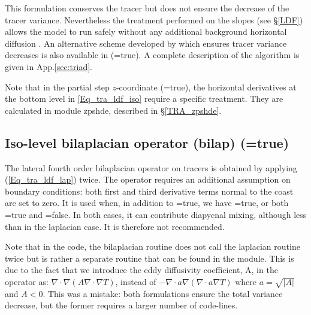 This formulation conserves the tracer but does not ensure the decrease 
of the tracer variance. Nevertheless the treatment performed on the slopes 
(see \S\ref{LDF}) allows the model to run safely without any additional 
background horizontal diffusion \citep{Guilyardi_al_CD01}. An alternative scheme 
developed by \cite{Griffies_al_JPO98} which ensures tracer variance decreases 
is also available in \NEMO (=true). A complete description of 
the algorithm is given in App.\ref{sec:triad}.

Note that in the partial step $z$-coordinate (=true), the horizontal 
derivatives at the bottom level in \eqref{Eq_tra_ldf_iso} require a specific 
treatment. They are calculated in module zpshde, described in \S\ref{TRA_zpshde}.

\subsection   [Iso-level bilaplacian operator (bilap) (\np{ln\_traldf\_bilap})]
			{Iso-level bilaplacian operator (bilap) (=true)}
\label{TRA_ldf_bilap}

The lateral fourth order bilaplacian operator on tracers is obtained by 
applying (\ref{Eq_tra_ldf_lap}) twice. The operator requires an additional assumption 
on boundary conditions: both first and third derivative terms normal to the 
coast are set to zero. It is used when, in addition to =true, 
we have =true, or both =true and 
=false. In both cases, it can contribute diapycnal mixing, 
although less than in the laplacian case. It is therefore not recommended.

Note that in the code, the bilaplacian routine does not call the laplacian 
routine twice but is rather a separate routine that can be found in the
 module. This is due to the fact that we introduce the 
eddy diffusivity coefficient, A, in the operator as: 
$\nabla \cdot \nabla \left( {A\nabla \cdot \nabla T} \right)$, 
instead of 
$-\nabla \cdot a\nabla \left( {\nabla \cdot a\nabla T} \right)$ 
where $a=\sqrt{|A|}$ and $A<0$. This was a mistake: both formulations 
ensure the total variance decrease, but the former requires a larger 
number of code-lines.

